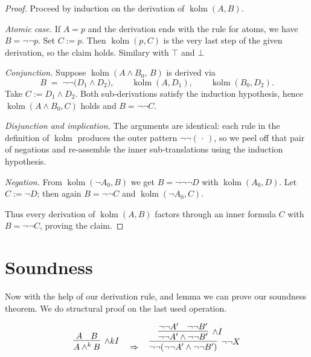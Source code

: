 \documentclass{article}
\begin{document}
    \begin{proof}
    Proceed by induction on the derivation of \(\operatorname{kolm}(A,B)\).
    
    \smallskip
    \emph{Atomic case.}  
    If \(A=p\) and the derivation ends with the rule for atoms, we have
    \(B=\neg\neg p\).  
    Set \(C:=p\).  
    Then \(\operatorname{kolm}(p,C)\) is the very last step of the given
    derivation, so the claim holds. Similary with $\top$ and $\bot$
    
    \smallskip
    \emph{Conjunction.}  
    Suppose \(\operatorname{kolm}(A\land B_0,\,B)\) is derived via
    \[
       B \;=\; \neg\neg\bigl(D_1\land D_2\bigr),
       \qquad
       \operatorname{kolm}(A,D_1),
       \qquad
       \operatorname{kolm}(B_0,D_2).
    \]
    Take \(C := D_1\land D_2\).
    Both sub‑derivations satisfy the induction hypothesis, hence
    \(\operatorname{kolm}(A\land B_0,C)\) holds and
    \(B=\neg\neg C\).
    
    \smallskip
    \emph{Disjunction and implication.}  
    The arguments are identical: each rule in the definition of
    \(\operatorname{kolm}\) produces the outer pattern
    \(\neg\neg(\,\cdot\,)\), so we peel off that pair of negations and
    re‑assemble the inner sub‑translations using the induction hypothesis.
    
    \smallskip
    \emph{Negation.}  
    From \(\operatorname{kolm}(\neg A_0,B)\) we get
    \(B=\neg\neg\neg D\) with \(\operatorname{kolm}(A_0,D)\).
    Let \(C := \neg D\); then again \(B=\neg\neg C\) and
    \(\operatorname{kolm}(\neg A_0,C)\).
    
    \smallskip
    Thus every derivation of \(\operatorname{kolm}(A,B)\) factors through
    an inner formula \(C\) with \(B=\neg\neg C\), proving the claim.
    \end{proof}
    



\section{Soundness}

Now with the help of our derivation rule, and lemma we can prove our soundness theorem. We do structural proof on the last used operation.

\vspace{3em}
\[
\infer[\land kI]{A \land^k B}{A & B}
\quad \Rightarrow \quad
\infer[\neg\neg X]{\neg\neg(\neg\neg A' \land \neg\neg B')}{
    \infer[\land I]{\neg\neg A' \land \neg\neg B'}{
      \neg\neg A' & \neg\neg B'
    }
}
\]
\end{document}
